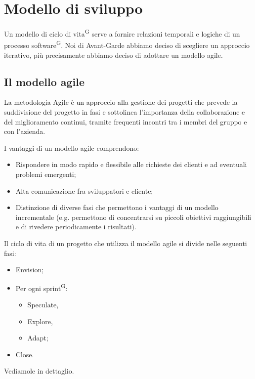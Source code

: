 \newpage
\section{Modello di sviluppo}\label{sec:modello_sviluppo}
Un modello di ciclo di vita\textsuperscript{G} serve a fornire relazioni temporali e logiche di un processo software\textsuperscript{G}.
Noi di Avant-Garde abbiamo deciso di scegliere un approccio iterativo, più precisamente abbiamo deciso di adottare un modello agile.

\subsection{Il modello agile}\label{sec:modello_sviluppo:agile}
La metodologia Agile è un approccio alla gestione dei progetti che prevede la suddivisione del progetto in fasi e sottolinea l'importanza della collaborazione e del miglioramento continui, tramite frequenti incontri tra i membri del gruppo e con l'azienda.

\noindent I vantaggi di un modello agile comprendono:
\begin{itemize}
    \item Rispondere in modo rapido e flessibile alle richieste dei clienti e ad eventuali problemi emergenti;
    \item Alta comunicazione fra sviluppatori e cliente;
    \item Distinzione di diverse fasi che permettono i vantaggi di un modello incrementale (e.g. permettono di concentrarsi su piccoli obiettivi raggiungibili e di rivedere periodicamente i risultati).
\end{itemize}
Il ciclo di vita di un progetto che utilizza il modello agile si divide nelle seguenti fasi:
\begin{itemize}
    \item Envision;
    \item Per ogni sprint\textsuperscript{G}:
    \begin{itemize}
        \item Speculate,
        \item Explore,
        \item Adapt;
    \end{itemize}
    \item Close.
\end{itemize}
Vediamole in dettaglio.

